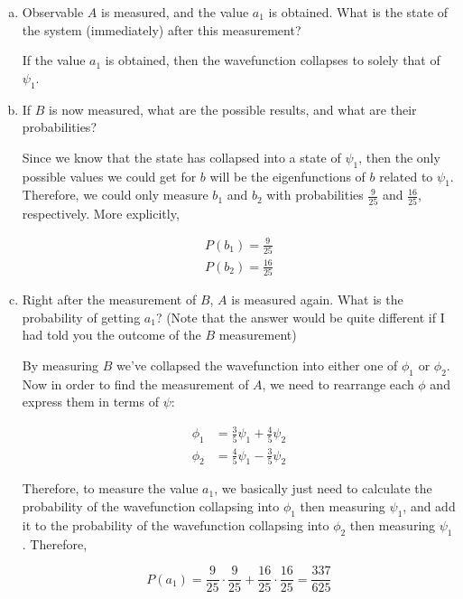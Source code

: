 \documentclass[10pt]{article}
\begin{document}
    \begin{enumerate}[(a)]
        \item Observable $A$ is measured, and the value $a_1$ is obtained. What is the state of the system (immediately) after this measurement?
        
        \begin{solution}
            If the value $a_1$ is obtained, then the wavefunction collapses to solely that of $\psi_1$. 
        \end{solution}
        \item If $B$ is now measured, what are the possible results, and what are their probabilities?
        \begin{solution}
            Since we know that the state has collapsed into a state of $\psi_1$, then the only possible values we could get for $b$ will be the eigenfunctions of $b$ related to $\psi_1$. Therefore, we could only measure $b_1$ and $b_2$ with probabilities $\frac{9}{25}$ and $\frac{16}{25}$, respectively. More explicitly, 

            \begin{align*}
                P(b_1) = \frac{9}{25}\\
                P(b_2) = \frac{16}{25}
            \end{align*}
        \end{solution}
        \item Right after the measurement of $B$, $A$ is measured again. What is the probability of getting $a_1$? (Note that the answer would be quite different if I had told you the outcome of the $B$ measurement)
        
        \begin{solution}
            By measuring $B$ we've collapsed the wavefunction into either one of $\phi_1$ or $\phi_2$. Now in order to find the measurement of $A$, we need to rearrange each $\phi$ and express them in terms of $\psi$: 

            \begin{align*}
                \phi_1 &= \frac 35 \psi_1 + \frac 45 \psi_2\\
                \phi_2 &= \frac 45 \psi_1 - \frac 35 \psi_2
            \end{align*}

            Therefore, to measure the value $a_1$, we basically just need to calculate the probability of the wavefunction collapsing into $\phi_1$ then measuring $\psi_1$, and add it to the probability of the wavefunction collapsing into $\phi_2$ then measuring $\psi_1$. Therefore, 

            \[ P(a_1) = \frac{9}{25} \cdot \frac{9}{25} + \frac{16}{25} \cdot \frac{16}{25} = \frac{337}{625}\]
        \end{solution}
    \end{enumerate}
    \pagebreak
\end{document}
